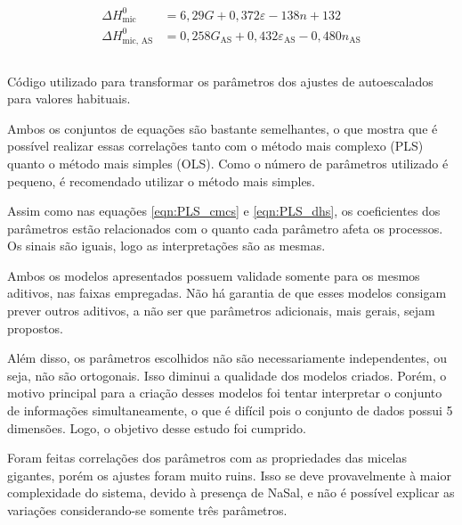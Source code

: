 		\begin{subequations}
			\begin{align}
			\Delta H_\textrm{mic}^0     & = 6,29G              + 0,372\varepsilon             - 138n               + 132  \label{eqn:ols_dh} \\
			\Delta H_\textrm{mic, AS}^0 & = 0,258G_\textrm{AS} + 0,432\varepsilon_\textrm{AS} - 0,480n_\textrm{AS}        \label{eqn:ols_dh_AS}
			\end{align}
			\label{eqn:ols_dhs}
		\end{subequations}
		
		\begin{listing}[h]
			\inputminted{python}{./python/ols_cmc_conversão.py}
			\caption{Código utilizado para transformar os parâmetros dos ajustes de autoescalados para valores habituais.}
			\label{lst:ols_cmc_conversao}
		\end{listing}
		
		Ambos os conjuntos de equações são bastante semelhantes, o que mostra que é possível realizar essas correlações tanto com o método mais complexo (PLS) quanto o método mais simples (OLS). Como o número de parâmetros utilizado é pequeno, é recomendado utilizar o método mais simples. %
		
		Assim como nas equações \ref{eqn:PLS_cmcs} e \ref{eqn:PLS_dhs}, os coeficientes dos parâmetros estão relacionados com o quanto cada parâmetro afeta os processos. Os sinais são iguais, logo as interpretações são as mesmas.
		
		Ambos os modelos apresentados possuem validade somente para os mesmos aditivos, nas faixas empregadas. Não há garantia de que esses modelos consigam prever outros aditivos, a não ser que parâmetros adicionais, mais gerais, sejam propostos.
		
		Além disso, os parâmetros escolhidos não são necessariamente independentes, ou seja, não são ortogonais. Isso diminui a qualidade dos modelos criados. Porém, o motivo principal para a criação desses modelos foi tentar interpretar o conjunto de informações simultaneamente, o que é difícil pois o conjunto de dados possui 5 dimensões. Logo, o objetivo desse estudo foi cumprido.%
		
		Foram feitas correlações dos parâmetros com as propriedades das micelas gigantes, porém os ajustes foram muito ruins. Isso se deve provavelmente à maior complexidade do sistema, devido à presença de NaSal, e não é possível explicar as variações considerando-se somente três parâmetros.
		
